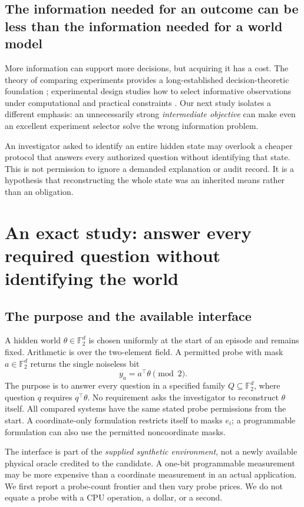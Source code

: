 \documentclass[11pt,letterpaper]{article}
\newcommand{\F}{\mathbb F_2}\newcommand{\1}{\mathbf 1}
\theoremstyle{remark}\newtheorem{remark}{Remark}[section]
\begin{document}
\subsection{The information needed for an outcome can be less than the information needed for a world model}
More information can support more decisions, but acquiring it has a cost. The theory of comparing experiments provides a long-established decision-theoretic foundation \citep{blackwell1953}; experimental design studies how to select informative observations under computational and practical constraints \citep{rainforth2023}. Our next study isolates a different emphasis: an unnecessarily strong \emph{intermediate objective} can make even an excellent experiment selector solve the wrong information problem.

An investigator asked to identify an entire hidden state may overlook a cheaper protocol that answers every authorized question without identifying that state. This is not permission to ignore a demanded explanation or audit record. It is a hypothesis that reconstructing the whole state was an inherited means rather than an obligation.

\section{An exact study: answer every required question without identifying the world}\label{sec:queries}
\subsection{The purpose and the available interface}
A hidden world $\theta\in\F^d$ is chosen uniformly at the start of an episode and remains fixed. Arithmetic is over the two-element field. A permitted probe with mask $a\in\F^d$ returns the single noiseless bit
\begin{equation}\label{eq:probe}
 y_a=a^\top\theta\pmod 2.
\end{equation}
The purpose is to answer every question in a specified family $Q\subseteq\F^d$, where question $q$ requires $q^\top\theta$. No requirement asks the investigator to reconstruct $\theta$ itself. All compared systems have the same stated probe permissions from the start. A coordinate-only formulation restricts itself to masks $e_i$; a programmable formulation can also use the permitted noncoordinate masks.

The interface is part of the \emph{supplied synthetic environment}, not a newly available physical oracle credited to the candidate. A one-bit programmable measurement may be more expensive than a coordinate measurement in an actual application. We first report a probe-count frontier and then vary probe prices. We do not equate a probe with a CPU operation, a dollar, or a second.
\end{document}
